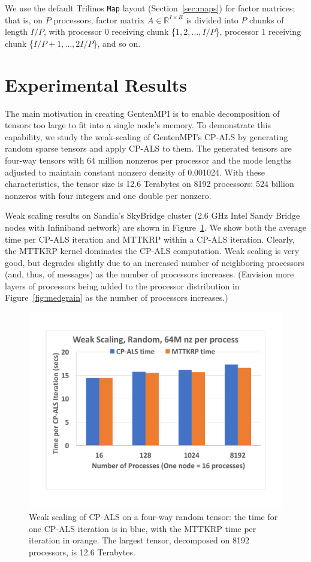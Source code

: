 We use
the default Trilinos {\tt Map} layout (Section~\ref{sec:maps})
for factor matrices; that is, on $P$ processors,
factor matrix $A \in \mathbb{R}^{I \times R}$ is divided into $P$ chunks
of length $I/P$, with processor 0 receiving chunk \{$1,2,\ldots,I/P$\},
processor 1 receiving chunk \{$I/P+1,\ldots,2I/P$\}, and so on.


\section{Experimental Results} \label{sec:cpals_exp}

The main motivation in creating GentenMPI is to enable decomposition of
tensors too large to fit into a single node's memory.  To demonstrate this
capability, we study the weak-scaling of GentenMPI's CP-ALS by 
generating random sparse tensors and apply CP-ALS to them.  The generated
tensors are four-way tensors with 64 million nonzeros per processor and the 
mode lengths adjusted to maintain constant nonzero density of 0.001024.
With these characteristics, the tensor size is 12.6 Terabytes on 8192
processors:  524 billion nonzeros with four integers and one double per nonzero.

Weak scaling results on Sandia's SkyBridge cluster (2.6 GHz Intel Sandy
Bridge nodes with Infiniband network) are shown in Figure~\ref{fig:huge}.
We show both the average time per CP-ALS iteration and MTTKRP within a 
CP-ALS iteration.  Clearly, the MTTKRP kernel dominates the CP-ALS computation.
Weak scaling is very good, but degrades slightly due to an increased number
of neighboring processors (and, thus, of messages) as the number of 
processors increases. (Envision more layers of processors being added to
the processor distribution in Figure~\ref{fig:medgrain} as the number of 
processors increases.)


\begin{figure}[ht]
   \centering
   \includegraphics[keepaspectratio=true, width=4.5in]{figs/huge}
   \caption[Weak scaling of CP-ALS]{Weak scaling of CP-ALS on a four-way random tensor:  the time for one CP-ALS iteration is in blue, with the MTTKRP time per iteration in orange.
The largest tensor, decomposed on 8192 processors, is 12.6 Terabytes.}
   \label{fig:huge}
\end{figure}



